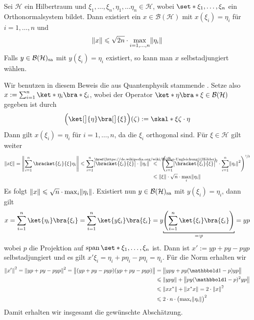 \begin{proposition}[label=prop:715,{name=[schwache Variante des Transitivitätssatzes]}]
	Sei $\mathcal{H}$ ein Hilbertraum und $\xi_1,\ldots ,\xi_n,\eta_1 ,\ldots \eta_n \in \mathcal{H}$, wobei $\set*{\xi_1, \ldots ,\xi_n}$ ein Orthonormalsystem bildet.
	Dann existiert ein $x \in \mathcal{B}(\mathcal{H})$ mit $x(\xi_i)=\eta_i$ für $i=1,\ldots,n$ und 
	\[
		\norm*{x} \le \sqrt{2n} \cdot \max_{i=1,\ldots ,n} \norm*{\eta_i}
	\]
	Falls $y \in \mathcal{B}(\mathcal{H})_{\mathrm{sa}}$ mit $y(\xi_i)=\eta_i$ existiert, so kann man $x$ selbstadjungiert wählen.
\end{proposition}
\begin{beweis}
	Wir benutzen in diesem Beweis die aus Quantenphysik stammende .
	Setze also $x := \sum_{i=1}^{n} \ket*{\eta_i} \bra*{\xi_i}$, wobei der Operator $\ket*{\eta} \bra*{\xi} \in \mathcal{B}(\mathcal{H})$ gegeben ist durch
	\[
		\enbrace[\Big]{\ket[\big]{\eta} \bra[\big]{\xi}} (\zeta) := \skal*{\xi}{\zeta} \cdot \eta
	\]
	Dann gilt $x(\xi_i) = \eta_i$ für $i=1,\ldots ,n$, da die $\xi_i$ orthogonal sind.
	Für $\xi \in \mathcal{H}$ gilt weiter 
	\begin{align}
		\norm*{x \xi} = \norm*{\sum_{i=1}^{n} \bracket{\xi_i}{\xi} \eta_i} \le \sum_{i=1}^{n} \abs[\big]{ \bracket{\xi_i}{\xi}} \cdot \norm*{\eta_i}\enspace &\StackTextClap{\href{https://de.wikipedia.org/wiki/Hölder-Ungleichung}{Hölder}}{\le}\enspace \enbrace*{\sum_{i=1}^{n} \abs[\big]{\bracket{\xi_i}{\xi}}^2 \cdot \sum_{i=1}^{n} \norm*{\eta_i}^2}^{\sfrac{1}{2}}\\
		&\le \norm*{\xi} \cdot \sqrt{n} \cdot \max_i \norm*{\eta_i}
	\end{align}
	Es folgt $\norm*{x} \le \sqrt{n} \cdot \max_i \norm*{\eta_i}$.
	Existiert nun $y \in \mathcal{B}(\mathcal{H})_{\mathrm{sa}}$ mit $y(\xi_i) =\eta_i$, dann gilt
	\[
		x = \sum_{i=1}^{n} \ket{\eta_i} \bra{\xi_i} = \sum_{i=1}^{n} \ket{y \xi_i} \bra{\xi_i} = y \Underbracket{\enbrace*{\sum_{i=1}^{n} \ket{\xi_i} \bra{\xi_i}}}{=:p} =y p
	\]
	wobei $p$ die Projektion auf $\Span \set*{\xi_1, \ldots ,\xi_n}$ ist. 
	Dann ist $x' := yp + py - pyp$ selbstadjungiert und es gilt $x' \xi_i = \eta_i + p \eta_i - p \eta_i=\eta_i$.
	Für die Norm erhalten wir
	\begin{align}
		\norm*{x'}^2 = \norm*{yp + py - pyp}^2 = \norm[\big]{ \enbrace*{yp+py-pyp} \enbrace*{yp + py - pyp}}&= \norm[\big]{ypy + py(\ind -p) yp} \\
		&\le \norm*{ypy} + \norm*{py(\ind-p)^2yp} \\
		&\le \norm*{xx^*} + \norm*{x^*x} = 2 \cdot \norm*{x}^2 \\
		&\le 2 \cdot n \cdot \enbrace[\big]{\max\nolimits_i \norm*{\eta_i}}^2
	\end{align}
	Damit erhalten wir insgesamt die gewünschte Abschätzung.
\end{beweis}

